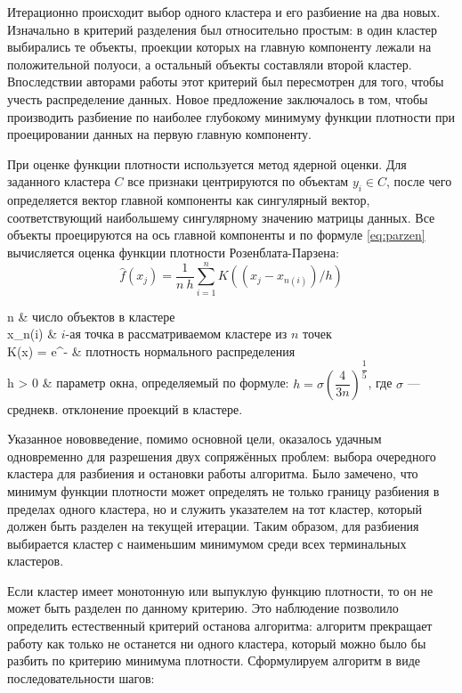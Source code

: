 \documentclass[12pt]{diploma}
\begin{document}
	Итерационно происходит выбор одного кластера и его разбиение на два новых. Изначально в \PDDP критерий разделения был относительно простым: в один кластер выбирались те объекты, проекции которых на главную компоненту \cite{pca-canonical} лежали на положительной полуоси, а остальный объекты составляли второй кластер. Впоследствии авторами работы \cite{enhanced-pddp} этот критерий был пересмотрен для того, чтобы учесть распределение данных. Новое предложение заключалось в том, чтобы производить разбиение по наиболее глубокому минимуму функции плотности при проецировании данных на первую главную компоненту. 
	
	При оценке функции плотности используется метод ядерной оценки. Для заданного кластера $ C $ все признаки центрируются по объектам $ y_i \in C $, после чего определяется вектор главной компоненты как сингулярный вектор, соответствующий наибольшему сингулярному значению матрицы данных. Все объекты проецируются на ось главной компоненты и по формуле \eqref{eq:parzen} вычисляется оценка функции плотности Розенблата-Парзена:
	\begin{equation} \label{eq:parzen}
		\hat{f}(x_j) = \frac{1}{n\:h} \sum_{i=1}^{n} K((x_j - x_{n(i)})/h)
	\end{equation}
	\begin{conditions}
		n & число объектов в кластере \\
		x_{n(i)} & $ i $-ая точка в рассматриваемом кластере из $ n $ точек\\
		K(x) = e^{-}  & плотность нормального распределения \\
		h > 0 & параметр окна, определяемый по формуле: $ h= \sigma \left(\dfrac{4}{3n}\right)^{\dfrac{1}{5}} $, \newline
		где $ \sigma $ --- среднекв. отклонение проекций в кластере.
	\end{conditions}	

	Указанное нововведение, помимо основной цели, оказалось удачным одновременно для разрешения двух сопряжённых проблем: выбора очередного кластера для разбиения и остановки работы алгоритма. Было замечено, что минимум функции плотности может определять не только границу разбиения в пределах одного кластера, но и служить указателем на тот кластер, который должен быть разделен на текущей итерации. Таким образом, для разбиения выбирается кластер с наименьшим минимумом среди всех терминальных кластеров. 
	
	Если кластер имеет монотонную или выпуклую функцию плотности, то он не может быть разделен по данному критерию. Это наблюдение позволило определить естественный критерий останова алгоритма: алгоритм прекращает работу как только не останется ни одного кластера, который можно было бы разбить по критерию минимума плотности. Сформулируем алгоритм \dePDDP в виде последовательности шагов:
\end{document}

